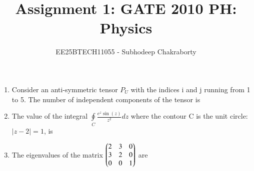 \documentclass[journal,12pt,onecolumn]{IEEEtran}
\theoremstyle{remark}
\begin{document}

\vspace{3cm}

\title{Assignment 1: GATE 2010 PH: Physics}
\author{EE25BTECH11055 - Subhodeep Chakraborty}
\maketitle
\hrulefill
\bigskip

\renewcommand{\thefigure}{\theenumi}
\renewcommand{\thetable}{\theenumi}


\begin{enumerate}
\item Consider an anti-symmetric tensor $P_{U}$ with the indices i and j running from 1 to 5. The number of independent components of the tensor is \hfill{}


\begin{enumerate}  \end{enumerate}

\item The value of the integral $\oint\limits_{C}\frac{e^{z}\sin(z)}{z^{2}}dz$ where the contour C is the unit circle: $|z-2|=1$, is\hfill{}


\begin{enumerate}  \end{enumerate}

\item The eigenvalues of the matrix $\begin{pmatrix} 2 & 3 & 0 \\ 3 & 2 & 0 \\ 0 & 0 & 1 \end{pmatrix}$ are\hfill{}


\begin{enumerate}  \end{enumerate}


\end{enumerate}
\end{document}

